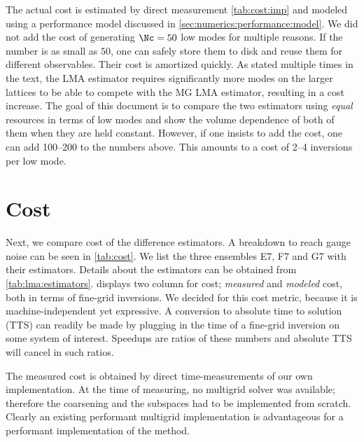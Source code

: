 \begin{table}[b!]
\begin{threeparttable}
{The actual cost is estimated by direct measurement \cref{tab:cost:imp} and modeled using a performance model discussed in \cref{sec:numerics:performance:model}.
We did not add the cost of generating $\Nc=50$ low modes for multiple reasons. If the number is as small as $50$, one can safely store them to disk and reuse them for different observables.
Their cost is amortized quickly.
As stated multiple times in the text, the LMA estimator requires significantly more modes on the larger lattices to be able to compete with the MG LMA estimator, resulting in a cost increase.
The goal of this document is to compare the two estimators using \emph{equal} resources in terms of low modes and show the volume dependence of both of them when they are held constant.
However, if one insists to add the cost, one can add \numrange{100}{200} to the numbers above.
This amounts to a cost of \numrange{2}{4} inversions per low mode.
}
\end{threeparttable}
\end{table}

\section{Cost}
\label{sec:cost}

Next, we compare cost of the difference estimators.
A breakdown to reach gauge noise can be seen in \cref{tab:cost}.
We list the three ensembles E7, F7 and G7 with their estimators.
Details about the estimators can be obtained from \cref{tab:lma:estimators}.
 displays two column for cost; \emph{measured} and \emph{modeled} cost, both in terms of fine-grid inversions.
We decided for this cost metric, because it is machine-independent yet expressive.
A conversion to absolute time to solution (TTS) can readily be made by plugging in the time of a fine-grid inversion on some system of interest.
Speedups are ratios of these numbers and absolute TTS will cancel in such ratios.

The measured cost is obtained by direct time-measurements of our own implementation.
At the time of measuring, no multigrid solver was available; therefore the coarsening and the subspaces had to be implemented from scratch.
Clearly an existing performant multigrid implementation is advantageous for a performant implementation of the method.

